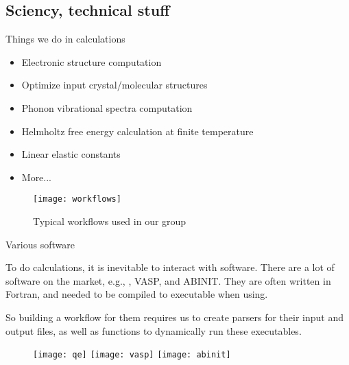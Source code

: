 \subsection{Sciency, technical stuff}

\begin{frame}{Things we do in \ab{} calculations}
    \begin{itemize}
        \item Electronic structure computation
        \item Optimize input crystal/molecular structures
        \item Phonon vibrational spectra computation
        \item Helmholtz free energy calculation at finite temperature
        \item Linear elastic constants
        \item More...
    \end{itemize}
    \begin{figure}[H]
        \centering
        \texttt{[image: workflows]}
        \caption{Typical \ab{} workflows used in our group}
        \label{eq:workflows}
    \end{figure}
\end{frame}

\begin{frame}{Various \ab{} software}

    To do \ab{} calculations, it is inevitable to interact with \ab{} software.
    There are a lot of software on the market, e.g., \qe{}, VASP, and ABINIT.
    They are often written in Fortran, and needed to be compiled to executable
    when using.

    So building a workflow for them requires us to create parsers for their input and output
    files, as well as functions to dynamically run these executables.

    \begin{figure}[b]
        \centering
        \texttt{[image: qe]}
        \hfill
        \texttt{[image: vasp]}
        \hfill
        \texttt{[image: abinit]}
        \label{fig:abinitsoftware}
    \end{figure}

\end{frame}

